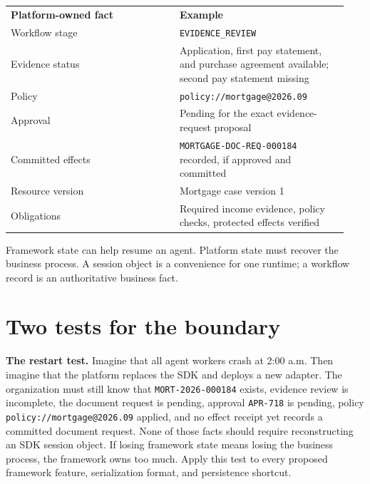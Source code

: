 \BookTableStart
\small
\begin{tabular}{@{}Y{0.4700\linewidth}Y{0.4700\linewidth}@{}}
\color{white}\bfseries Platform-owned fact & \color{white}\bfseries Example \\
Workflow stage & \lstinline[style=bookinline]!EVIDENCE_REVIEW! \\
Evidence status & Application, first pay statement, and purchase agreement available; second pay statement missing \\
Policy & \lstinline[style=bookinline]!policy://mortgage@2026.09! \\
Approval & Pending for the exact evidence-request proposal \\
Committed effects & \lstinline[style=bookinline]!MORTGAGE-DOC-REQ-000184! recorded, if approved and committed \\
Resource version & Mortgage case version 1 \\
Obligations & Required income evidence, policy checks, protected effects verified \\
\end{tabular}
\BookTableEnd

Framework state can help resume an agent. Platform state must recover the business process. A session object is a convenience for one runtime; a workflow record is an authoritative business fact.\par

\section{Two tests for the boundary}

\textbf{The restart test.} Imagine that all agent workers crash at 2:00 a.m. Then imagine that the platform replaces the SDK and deploys a new adapter. The organization must still know that \lstinline[style=bookinline]!MORT-2026-000184! exists, evidence review is incomplete, the document request is pending, approval \lstinline[style=bookinline]!APR-718! is pending, policy \lstinline[style=bookinline]!policy://mortgage@2026.09! applied, and no effect receipt yet records a committed document request. None of those facts should require reconstructing an SDK session object. If losing framework state means losing the business process, the framework owns too much. Apply this test to every proposed framework feature, serialization format, and persistence shortcut.\par

